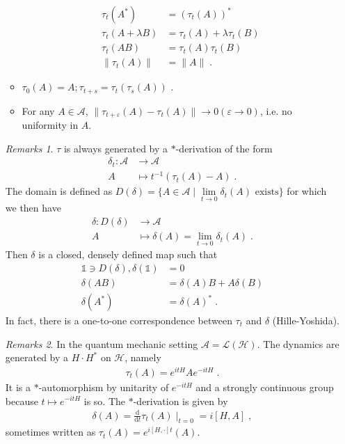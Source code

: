 \documentclass[
a4paper, %
11pt, %
onecolumn, %
openany, %
]{memoir}
\theoremstyle{definition}
\theoremstyle{remark}
\newtheorem{remarks}{Remarks}[chapter]
\theoremstyle{plain}
\begin{document}
\begin{enumerate}
\begin{itemize}
\begin{align}
	\tau_t(A^*)&=(\tau_t(A))^*\\
	\tau_t(A+\lambda B)&=\tau_t(A)+\lambda\tau_t(B)\\
	\tau_t(AB)&=\tau_t(A)\tau_t(B)\\
	\|\tau_t(A)\|&=\|A\|\; .
	\end{align}
	\item $\tau_0(A)=A; \tau_{t+s}=\tau_t(\tau_s(A))$ \; .
	\item For any $A\in \mathcal{A}$, $\| \tau_{t+\varepsilon}(A)-\tau_{t}(A)\|\rightarrow 0 (\varepsilon \rightarrow 0)$, i.e. no uniformity in $A$.
\end{itemize}
\begin{remarks}
	$\tau$ is always generated by a $*$-derivation of the form \begin{align}
	\delta_t:\mathcal{A}&\longrightarrow \mathcal{A}\\
	A&\longmapsto t^{-1}(\tau_t(A)-A)\; .
	\end{align}
	The domain is defined as $D(\delta)=\{A\in\mathcal{A} \mid \lim\limits_{t\rightarrow 0}\delta_t(A) \text{ exists}\}$ for which we then have \begin{align}
	\delta: D(\delta)&\longrightarrow \mathcal{A}\\
	A&\longmapsto \delta(A)=\lim_{t\rightarrow 0}\delta_t(A)\; .
	\end{align}
	Then $\delta$ is a closed, densely defined map such that \begin{align*}
	\mathds{1}\ni D(\delta), \delta(\mathds{1})&=0\\
							\delta(AB)&=\delta(A)B+A\delta(B)\\
							\delta(A^*)&=\delta(A)^*\;  .
	\end{align*}
	In fact, there is a one-to-one correspondence between $\tau_t$ and $\delta$ (Hille-Yoshida).
\end{remarks}
\begin{remarks}
	In the quantum mechanic setting $\mathcal{A}=\mathcal{L}(\mathcal{H})$. The dynamics are generated by a $H\cdot H^*$ on $\mathcal{H}$, namely \begin{align}
	\tau_t(A)=e^{itH}Ae^{-itH}\; .
	\end{align}
	It is a $*$-automorphism by unitarity of $e^{-itH}$ and a strongly continuous group because $t\mapsto e^{-itH}$ is so. The $*$-derivation is given by \begin{align*}
	\delta(A)=\frac{\mathrm{d}}{\mathrm{d}t}\tau_t(A)\mid_{t=0}=i[H,A]\; ,
	\end{align*}
	sometimes written as $\tau_t(A)=e^{i[H,\cdot]t}(A)$.

\end{remarks}
\end{enumerate}
\end{document}
